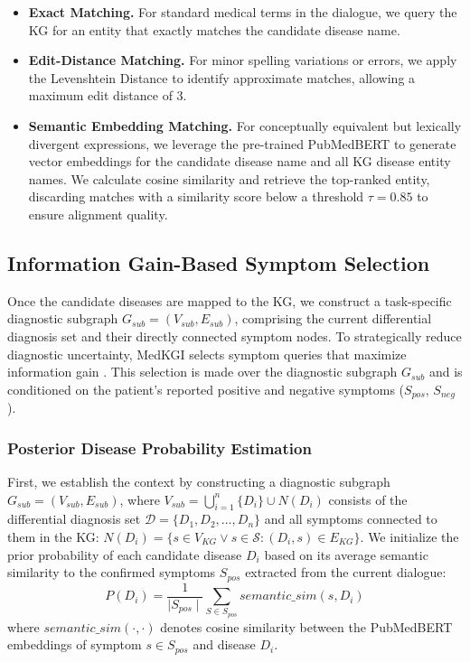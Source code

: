 \documentclass[11pt]{article}
\newcommand{\tool}{MedKGI{\xspace}}
\begin{document}
\begin{itemize}
	\item \textbf{Exact Matching.} For standard medical terms in the dialogue, we query the KG for an entity that exactly matches the candidate disease name.
	\item \textbf{Edit-Distance Matching.} For minor spelling variations or errors, we apply the Levenshtein Distance \cite{Levenshtein1965BinaryCC} to identify approximate matches, allowing a maximum edit distance of 3.
	\item \textbf{Semantic Embedding Matching.} For conceptually equivalent but lexically divergent expressions, we leverage the pre-trained PubMedBERT \cite{pubmedbert2021} to generate vector embeddings for the candidate disease name and all KG disease entity names. We calculate cosine similarity and retrieve the top-ranked entity, discarding matches with a similarity score below a threshold $\tau=0.85$ to ensure alignment quality.
\end{itemize}

\subsection{Information Gain-Based Symptom Selection}

Once the candidate diseases are mapped to the KG, we construct a task-specific diagnostic subgraph $G_{sub} = (V_{sub}, E_{sub})$, comprising the current differential diagnosis set and their directly connected symptom nodes.
To strategically reduce diagnostic uncertainty, \tool{} selects symptom queries that maximize information gain \cite{informationgain1986}. This selection is made over the diagnostic subgraph $G_{sub}$ and is conditioned on the patient's reported positive and negative symptoms ($S_{pos} \text{, } S_{neg}$).

\subsubsection{Posterior Disease Probability Estimation}

First, we establish the context by constructing a diagnostic subgraph $G_{sub}=(V_{sub}, E_{sub})$, where $V_{sub}={\textstyle \bigcup_{i=1}^{n}} \{D_i\} \cup N(D_i)$ consists of the differential diagnosis set $\mathcal{D} = \{ D_1, D_2, \dots, D_n \} $ and all symptoms connected to them in the KG: $N(D_i)=\{ s \in V_{KG} \vee s \in \mathcal{S} : (D_i, s) \in E_{KG} \}$.
We initialize the prior probability of each candidate disease $D_i$ based on its average semantic similarity to the confirmed symptoms $S_{pos}$ extracted from the current dialogue:
$$P(D_i)=\frac{1}{\mid S_{pos} \mid} \sum_{S \in S_{pos}} semantic\_sim(s, D_i) $$
where $semantic\_sim(\cdot, \cdot)$ denotes cosine similarity between the PubMedBERT \cite{pubmedbert2021} embeddings of symptom $s \in S_{pos}$ and disease $D_i$.
\end{document}
